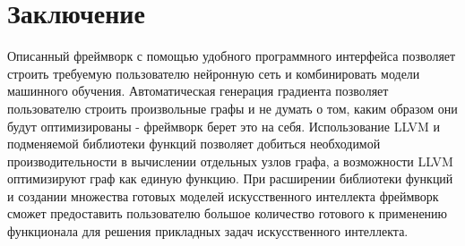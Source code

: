 \clearpage
\section{Заключение}
Описанный фреймворк с помощью удобного программного интерфейса позволяет строить требуемую пользователю нейронную сеть и комбинировать модели машинного обучения. Автоматическая генерация градиента позволяет пользователю строить произвольные графы и не думать о том, каким образом они будут оптимизированы - фреймворк берет это на себя. Использование LLVM и подменяемой библиотеки функций позволяет добиться необходимой производительности в вычислении отдельных узлов графа, а возможности LLVM оптимизируют граф как единую функцию. При расширении библиотеки функций и создании множества готовых моделей искусственного интеллекта фреймворк сможет предоставить пользователю большое количество готового к применению функционала для решения прикладных задач искусственного интеллекта.
